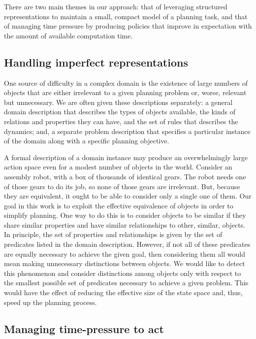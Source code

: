 There are two main themes in our approach: that of leveraging
structured representations to maintain a small, compact model of a
planning task, and that of managing time pressure by producing
policies that improve in expectation with the amount of available
computation time.


\subsection{Handling imperfect representations}


One source of difficulty in a complex domain is the existence of large
numbers of objects that are either irrelevant to a given planning
problem or, worse, relevant but unnecessary.  We are often given these
descriptions separately: a general domain description that describes
the types of objects available, the kinds of relations and properties
they can have, and the set of rules that describes the dynamics; and,
a separate problem description that specifies a particular instance of
the domain along with a specific planning objective.

A formal description of a domain instance may produce an
overwhelmingly large action space even for a modest number of objects
in the world.  Consider an assembly robot, with a box of thousands of
identical gears.  The robot needs one of those gears to do its job, so
none of those gears are irrelevant.  But, because they are equivalent,
it ought to be able to consider only a single one of them.  Our goal
in this work is to exploit the effective equivalence of objects in
order to simplify planning.  One way to do this is to consider objects
to be similar if they share similar properties and have similar
relationships to other, similar, objects.  In principle, the set of
properties and relationships is given by the set of predicates listed
in the domain description.  However, if not all of these predicates
are equally necessary to achieve the given goal, then considering them
all would mean making unnecessary distinctions between objects. We
would like to detect this phenomenon and consider distinctions among
objects only with respect to the smallest possible set of predicates
necessary to achieve a given problem.  This would have the effect of
reducing the effective size of the state space and, thus, speed up the
planning process.


\subsection{Managing time-pressure to act}

